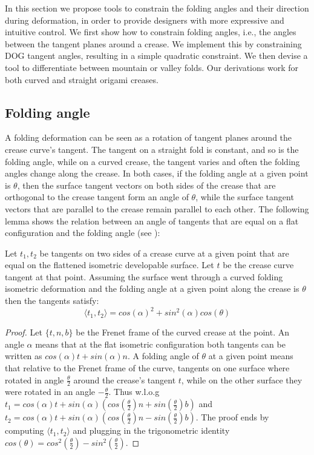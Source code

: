 In this section we propose tools to constrain the folding angles and their direction during deformation, in order to provide designers with more expressive and intuitive control. We first show how to constrain folding angles, i.e., the angles between the tangent planes around a crease. We implement this by constraining DOG tangent angles, resulting in a simple quadratic constraint. We then devise a tool to differentiate between mountain or valley folds. Our derivations work for both curved and straight origami creases.

\subsection{Folding angle} 

A folding deformation can be seen as a rotation of tangent planes around the crease curve's tangent. The tangent on a straight fold is constant, and so is the folding angle, while on a curved crease, the tangent varies and often the folding angles change along the crease. In both cases, if the folding angle at a given point is $\theta$, then the surface tangent vectors on both sides of the crease that are orthogonal to the crease tangent form an angle of $\theta$, while the surface tangent vectors that are parallel to the crease remain parallel to each other. The following lemma shows the relation between an angle of tangents that are equal on a flat configuration and the folding angle (see ): 
 \begin{lemma}  \label{lem:tangents_dihedral}
 Let $t_1,t_2$ be tangents on two sides of a crease curve at a given point that are equal on the flattened isometric developable surface. Let $t$ be the crease curve tangent at that point. Assuming the surface went through a curved folding isometric deformation and the folding angle at a given point along the crease is $\theta$ then the tangents satisfy:
\begin{equation} \label{eq:tangents_dihedral}
\langle t_1, t_2 \rangle = cos(\alpha)^2 + sin^2(\alpha) cos(\theta) \end{equation}
\end{lemma}
\begin{proof}{Let $\{t,n,b\}$ be the Frenet frame of the curved crease at the point. An angle $\alpha$ means that at the flat isometric configuration both tangents can be written as $cos(\alpha)t + sin(\alpha)n$. A folding angle of $\theta$ at a given point means that relative to the Frenet frame of the curve, tangents on one surface where rotated in angle $\frac{\theta}{2}$ around the crease's tangent $t$, while on the other surface they were rotated in an angle  $-\frac{\theta}{2}$. Thus w.l.o.g $t_1 = cos(\alpha)t + sin(\alpha)(cos(\frac{\theta}{2})n+sin(\frac{\theta}{2})b)$ and $t_2 = cos(\alpha)t + sin(\alpha)(cos(\frac{\theta}{2})n-sin(\frac{\theta}{2})b)$. The proof ends by computing $\langle t_1,t_2 \rangle$ and plugging in the trigonometric identity $cos(\theta) = cos^2(\frac{\theta}{2})-sin^2(\frac{\theta}{2})$.}\end{proof}


